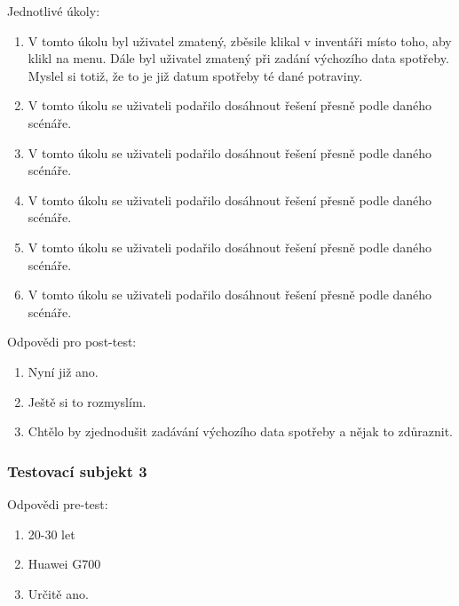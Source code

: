 \documentclass[thesis=B,czech]{FITthesis}[2013/10/20]
\begin{document}
Jednotlivé úkoly:
\begin{enumerate}
  \item V tomto úkolu byl uživatel zmatený, zběsile klikal v inventáři místo toho, aby klikl na menu. Dále byl uživatel zmatený při zadání výchozího data spotřeby. Myslel si totiž, že to je již datum spotřeby té dané potraviny.
  \item V tomto úkolu se uživateli podařilo dosáhnout řešení přesně podle daného scénáře.
  \item V tomto úkolu se uživateli podařilo dosáhnout řešení přesně podle daného scénáře.
  \item V tomto úkolu se uživateli podařilo dosáhnout řešení přesně podle daného scénáře.
  \item V tomto úkolu se uživateli podařilo dosáhnout řešení přesně podle daného scénáře.
  \item V tomto úkolu se uživateli podařilo dosáhnout řešení přesně podle daného scénáře.
\end{enumerate}

Odpovědi pro post-test:
\begin{enumerate}
  \item Nyní již ano.
  \item Ještě si to rozmyslím.
  \item Chtělo by zjednodušit zadávání výchozího data spotřeby a nějak to zdůraznit.
\end{enumerate}

\subsubsection{Testovací subjekt 3}

Odpovědi pre-test:

\begin{enumerate}
  \item 20-30 let
  \item Huawei G700
  \item Určitě ano.
\end{enumerate}
\end{document}
